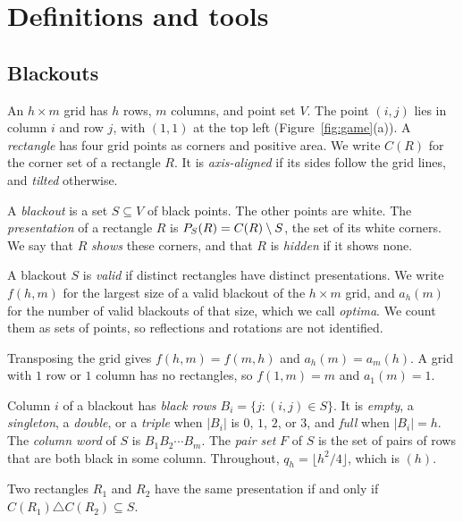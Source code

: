 \section{Definitions and tools}\label{sec:setup}

\subsection{Blackouts}

An $h\times m$ grid has $h$ rows, $m$ columns, and point set $V$. The point
$(i,j)$ lies in column $i$ and row $j$, with $(1,1)$ at the top left
(Figure~\ref{fig:game}(a)). A \emph{rectangle} has four grid points as corners
and positive area. We write $C(R)$ for the corner set of a rectangle $R$. It is
\emph{axis-aligned} if its sides follow the grid lines, and \emph{tilted}
otherwise.

A \emph{blackout} is a set $S\subseteq V$ of black points. The other points are
white. The \emph{presentation} of a rectangle $R$ is $P_S(R)=C(R)\setminus S$,
the set of its white corners. We say that $R$ \emph{shows} these corners, and
that $R$ is \emph{hidden} if it shows none.

\begin{definition}\label{def:valid}
A blackout $S$ is \emph{valid} if distinct rectangles have distinct
presentations. We write $f(h,m)$ for the largest size of a valid blackout
of the $h\times m$ grid, and $a_h(m)$ for the number of valid blackouts of that
size, which we call \emph{optima}. We count them as sets of points, so
reflections and rotations are not identified.
\end{definition}

Transposing the grid gives $f(h,m)=f(m,h)$ and $a_h(m)=a_m(h)$. A grid with
$1$ row or $1$ column has no rectangles, so $f(1,m)=m$ and $a_1(m)=1$.

Column $i$ of a blackout has \emph{black rows} $B_i=\{j:(i,j)\in S\}$. It is
\emph{empty}, a \emph{singleton}, a \emph{double}, or a \emph{triple} when
$|B_i|$ is $0$, $1$, $2$, or $3$, and \emph{full} when $|B_i|=h$. The \emph{column
word} of $S$ is $B_1B_2\cdots B_m$. The \emph{pair set} $F$ of $S$ is the set of
pairs of rows that are both black in some column. Throughout,
$q_h=\lfloor h^2/4\rfloor$, which is $(h)$.

\begin{lemma}\label{lem:diff}
Two rectangles $R_1$ and $R_2$ have the same presentation if and only if
$C(R_1)\triangle C(R_2)\subseteq S$.
\end{lemma}

